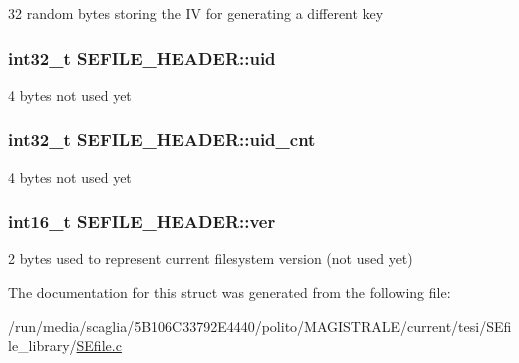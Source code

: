 32 random bytes storing the I\-V for generating a different key \hypertarget{struct_s_e_f_i_l_e___h_e_a_d_e_r_a3c573cee7709f63a385460ad21637ec1}{
\subsubsection[{uid}]{\setlength{\rightskip}{0pt plus 5cm}int32\-\_\-t S\-E\-F\-I\-L\-E\-\_\-\-H\-E\-A\-D\-E\-R\-::uid}}\label{struct_s_e_f_i_l_e___h_e_a_d_e_r_a3c573cee7709f63a385460ad21637ec1}
4 bytes not used yet \hypertarget{struct_s_e_f_i_l_e___h_e_a_d_e_r_ae10c6516ac00e694db72a45ef16a214c}{
\subsubsection[{uid\-\_\-cnt}]{\setlength{\rightskip}{0pt plus 5cm}int32\-\_\-t S\-E\-F\-I\-L\-E\-\_\-\-H\-E\-A\-D\-E\-R\-::uid\-\_\-cnt}}\label{struct_s_e_f_i_l_e___h_e_a_d_e_r_ae10c6516ac00e694db72a45ef16a214c}
4 bytes not used yet \hypertarget{struct_s_e_f_i_l_e___h_e_a_d_e_r_a243bb9ed827d6f802720231425ee240c}{
\subsubsection[{ver}]{\setlength{\rightskip}{0pt plus 5cm}int16\-\_\-t S\-E\-F\-I\-L\-E\-\_\-\-H\-E\-A\-D\-E\-R\-::ver}}\label{struct_s_e_f_i_l_e___h_e_a_d_e_r_a243bb9ed827d6f802720231425ee240c}
2 bytes used to represent current filesystem version (not used yet) 

The documentation for this struct was generated from the following file\-:\begin{DoxyCompactItemize}
\item 
/run/media/scaglia/5\-B106\-C33792\-E4440/polito/\-M\-A\-G\-I\-S\-T\-R\-A\-L\-E/current/tesi/\-S\-Efile\-\_\-library/\hyperlink{_s_efile_8c}{S\-Efile.\-c}\end{DoxyCompactItemize}
